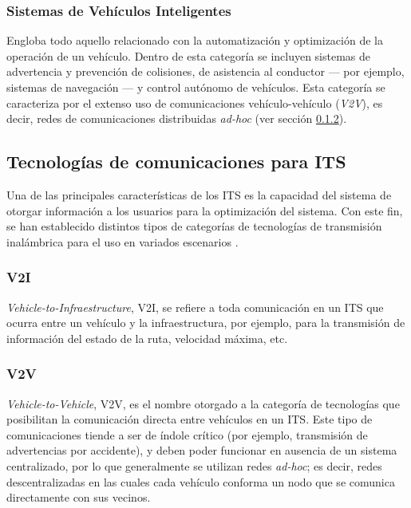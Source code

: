 \subsubsection{Sistemas de Vehículos Inteligentes}

Engloba todo aquello relacionado con la automatización y optimización de la operación de un vehículo. Dentro de esta categoría se incluyen sistemas de advertencia y prevención de colisiones, de asistencia al conductor --- por ejemplo, sistemas de navegación --- y control autónomo de vehículos. Esta categoría se caracteriza por el extenso uso de comunicaciones vehículo-vehículo (\emph{V2V}), es decir, redes de comunicaciones distribuidas \emph{ad-hoc} (ver sección \ref{sec:its_comms:v2v}).

\subsection{Tecnologías de comunicaciones para ITS}\label{sec:its_comms}

Una de las principales características de los ITS es la capacidad del sistema de otorgar información a los usuarios para la optimización del sistema. Con este fin, se han establecido distintos tipos de categorías de tecnologías de transmisión inalámbrica para el uso en variados escenarios \autocite{dar2010wireless}.

\subsubsection{V2I}

\emph{Vehicle-to-Infraestructure}, V2I, se refiere a toda comunicación en un ITS que ocurra entre un vehículo y la infraestructura, por ejemplo, para la transmisión de información del estado de la ruta, velocidad máxima, etc. 
 
\subsubsection{V2V}\label{sec:its_comms:v2v}

\emph{Vehicle-to-Vehicle}, V2V, es el nombre otorgado a la categoría de tecnologías que posibilitan la comunicación directa entre vehículos en un ITS. Este tipo de comunicaciones tiende a ser de índole crítico (por ejemplo, transmisión de advertencias por accidente), y deben poder funcionar en ausencia de un sistema centralizado, por lo que generalmente se utilizan redes \emph{ad-hoc}; es decir, redes descentralizadas en las cuales cada vehículo conforma un nodo que se comunica directamente con sus vecinos. 

